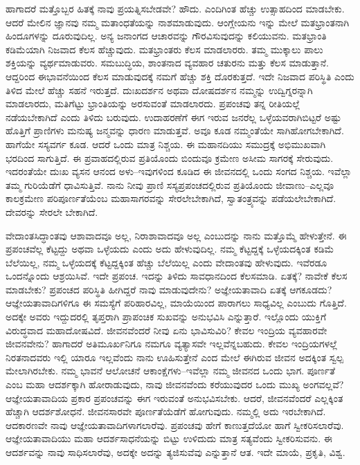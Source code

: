 ಹಾಗಾದರೆ ಮತ್ತೊಬ್ಬರ ಹಿತಕ್ಕೆ ನಾವು ಪ್ರಯತ್ನಿಸಬೇಡವೇ? ಹೌದು. ಎಂದಿಗಿಂತ ಹೆಚ್ಚು ಉತ್ಸಾಹದಿಂದ ಮಾಡಬೇಕು. ಆದರೆ ಮೇಲಿನ ಜ್ಞಾನವು ನಮ್ಮ ಮತಾಂಧತೆಯನ್ನು ನಾಶಮಾಡುವುದು. ಆಂಗ್ಲೇಯನು ಇನ್ನು ಮೇಲೆ ಮತಭ್ರಾಂತನಾಗಿ ಹಿಂದೂಗಳನ್ನು ದೂರುವುದಿಲ್ಲ. ಅನ್ಯ ಜನಾಂಗದ ಆಚಾರವನ್ನು ಗೌರವಿಸುವುದನ್ನು ಕಲಿಯುವನು. ಮತಭ್ರಾಂತಿ ಕಡಿಮೆಯಾಗಿ ನಿಜವಾದ ಕೆಲಸ ಹೆಚ್ಚುವುದು. ಮತಭ್ರಾಂತರು ಕೆಲಸ ಮಾಡಲಾರರು. ತಮ್ಮ ಮುಕ್ಕಾಲು ಪಾಲು ಶಕ್ತಿಯನ್ನು ವ್ಯರ್ಥಮಾಡುವರು. ಸಮಬುದ್ಧಿಯ, ಶಾಂತನಾದ ವ್ಯವಹಾರ ಚತುರನು ಮತ್ತು ಕೆಲಸ ಮಾಡುತ್ತಾನೆ. ಆದ್ದರಿಂದ ಈ\break ಭಾವನೆಯಿಂದ ಕೆಲಸ ಮಾಡುವುದಕ್ಕೆ ನಮಗೆ ಹೆಚ್ಚು ಶಕ್ತಿ ದೊರಕುತ್ತದೆ. ಇದೇ ನಿಜವಾದ ಪರಿಸ್ಥಿತಿ ಎಂದು ತಿಳಿದ ಮೇಲೆ ಹೆಚ್ಚು ಸಹನೆ ಇರುತ್ತದೆ. ದುಃಖದರ್ಶನ ಅಥವಾ ದೋಷದರ್ಶನ ನಮ್ಮನ್ನು ಉದ್ವಿಗ್ನರನ್ನಾಗಿ ಮಾಡಲಾರದು, ಮತಿಗೆಟ್ಟು ಭ್ರಾಂತಿಯನ್ನು ಅರಸುವಂತೆ ಮಾಡಲಾರದು. ಪ್ರಪಂಚವು ತನ್ನ ರೀತಿಯಲ್ಲೆ ನಡೆಯಬೇಕಾಗಿದೆ ಎಂದು ತಿಳಿದು ಬರುವುದು. ಉದಾಹರಣೆಗೆ ಈಗ ಇರುವ ಜನರೆಲ್ಲ ಒಳ್ಳೆಯವರಾಗಿಬಿಟ್ಟರೆ ಅಷ್ಟು ಹೊತ್ತಿಗೆ ಪ್ರಾಣಿಗಳು ಮನುಷ್ಯ ಜನ್ಮವನ್ನು ಧಾರಣ ಮಾಡುತ್ತವೆ. ಅವೂ ಕೂಡ ನಮ್ಮಂತೆಯೇ ಸಾಗಿಹೋಗಬೇಕಾಗಿದೆ. ಹಾಗೆಯೇ ಸಸ್ಯವರ್ಗ ಕೂಡ. ಆದರೆ ಒಂದು ಮಾತ್ರ ನಿಶ್ಚಯ. ಈ ಮಹಾನದಿಯು ಸಮುದ್ರಕ್ಕೆ ಅಭಿಮುಖವಾಗಿ ಭರದಿಂದ ಸಾಗುತ್ತಿದೆ. ಈ ಪ್ರವಾಹದಲ್ಲಿರುವ ಪ್ರತಿಯೊಂದು ಬಿಂದುವೂ ಕ್ರಮೇಣ ಅಸೀಮ ಸಾಗರಕ್ಕೆ ಸೇರುವುದು. ಇದರಂತೆಯೇ ದುಃಖ ವ್ಯಸನ ಆನಂದ ಅಳು–ಇವುಗಳಿಂದ ಕೂಡಿದ ಈ ಜೀವನದಲ್ಲಿ ಒಂದು ಸಂಗದ ನಿಶ್ಚಯ. ಇವೆಲ್ಲಾ ತಮ್ಮ ಗುರಿಯೆಡೆಗೆ ಧಾವಿಸುತ್ತಿವೆ. ನಾನು ನೀವು ಪ್ರಾಣಿ ಸಸ್ಯಪ್ರಪಂಚದಲ್ಲಿರುವ ಪ್ರತಿಯೊಂದು ಜೀವಾಣು–ಎಲ್ಲವೂ ಕಾಲಕ್ರಮೇಣ ಪರಿಪೂರ್ಣತೆಯೆಂಬ ಮಹಾಸಾಗರವನ್ನು ಸೇರಲೇಬೇಕಾಗಿದೆ, ಸ್ವಾತಂತ್ರ್ಯವನ್ನು ಪಡೆಯಲೇಬೇಕಾಗಿದೆ. ದೇವರನ್ನು ಸೇರಲೇ ಬೇಕಾಗಿದೆ.

\vskip 2pt

ವೇದಾಂತಸಿದ್ಧಾಂತವು ಆಶಾವಾದವೂ ಅಲ್ಲ, ನಿರಾಶಾವಾದವೂ ಅಲ್ಲ ಎಂಬುದನ್ನು ನಾನು ಮತ್ತೊಮ್ಮೆ ಹೇಳುತ್ತೇನೆ. ಈ ಪ್ರಪಂಚವೆಲ್ಲ ಕೆಟ್ಟದ್ದು ಅಥವಾ ಒಳ್ಳೆಯದು ಎಂದು ಅದು ಹೇಳುವುದಿಲ್ಲ. ನಮ್ಮ ಕೆಟ್ಟದ್ದಕ್ಕೆ ಒಳ್ಳೆಯದಕ್ಕಿಂತ ಕಡಿಮೆ ಬೆಲೆಯಿಲ್ಲ, ನಮ್ಮ ಒಳ್ಳೆಯದಕ್ಕೆ ಕೆಟ್ಟದ್ದಕ್ಕಿಂತ ಹೆಚ್ಚು ಬೆಲೆಯಿಲ್ಲ ಎಂದು ವೇದಾಂತವು ಹೇಳುವುದು. ಇವೆರಡೂ ಒಂದನ್ನೊಂದು ಆಶ್ರಯಿಸಿವೆ. ಇದೇ ಪ್ರಪಂಚ. ಇದನ್ನು ತಿಳಿದು ಸಾವಧಾನದಿಂದ ಕೆಲಸಮಾಡಿ. ಏತಕ್ಕೆ? ನಾವೇಕೆ ಕೆಲಸ ಮಾಡಬೇಕು? ಪ್ರಪಂಚದ ಪರಿಸ್ಥಿತಿ ಹೀಗಿದ್ದರೆ ನಾವು ಮಾಡುವುದೇನು? ಅಜ್ಞೇಯತಾವಾದಿ ಏತಕ್ಕೆ ಆಗಕೂಡದು? ಆಜ್ಞೇಯತಾವಾದಿಗಳಿಗೂ ಈ ಸಮಸ್ಯೆಗೆ ಪರಿಹಾರವಿಲ್ಲ, ಮಾಯೆಯಿಂದ ಪಾರಾಗಲು ಸಾಧ್ಯವಿಲ್ಲ ಎಂಬುದು ಗೊತ್ತಿದೆ. ಅದಕ್ಕೇ ಅವರು ಇದ್ದುದರಲ್ಲಿ ತೃಪ್ತರಾಗಿ ಪ್ರಾಪಂಚಿಕ ಸುಖವನ್ನು ಅನುಭವಿಸಿ ಎನ್ನುತ್ತಾರೆ. ಇಲ್ಲೊಂದು ಯುಕ್ತಿಗೆ ವಿರುದ್ಧವಾದ ಮಹಾದೋಷವಿದೆ. ಜೀವನವೆಂದರೆ ನೀವು ಏನು ಭಾವಿಸುವಿರಿ? ಕೇವಲ ಇಂದ್ರಿಯ ವ್ಯವಹಾರವೇ ಜೀವನವೇನು? ಹಾಗಾದರೆ ಅತಿಮೂರ್ಖನಿಗೂ ನಮಗೂ ವ್ಯತ್ಯಾಸವೇ ಇಲ್ಲವೆನ್ನಬಹುದು. ಕೇವಲ ಇಂದ್ರಿಯಗಳಲ್ಲೆ ನಿರತನಾದವರು ಇಲ್ಲಿ ಯಾರೂ ಇಲ್ಲವೆಂದು ನಾನು ಊಹಿಸುತ್ತೇನೆ ಎಂದ ಮೇಲೆ ಈಗಿರುವ ಜೀವನ ಅದಕ್ಕಿಂತ ಸ್ವಲ್ಪ ಮೇಲಾಗಿರಬೇಕು. ನಮ್ಮ ಭಾವನೆ ಆಲೋಚನೆ ಆಕಾಂಕ್ಷೆಗಳು–ಇವೆಲ್ಲಾ ನಮ್ಮ ಜೀವನದ ಒಂದು ಭಾಗ. ಪೂರ್ಣತೆ ಎಂಬ ಮಹಾ ಆದರ್ಶಕ್ಕಾಗಿ ಹೋರಾಡುವುದು, ನಾವು ಜೀವನವೆಂದು ಕರೆಯುವುದರ ಒಂದು ಮುಖ್ಯ ಅಂಗವಲ್ಲವೆ? ಆಜ್ಞೇಯತಾವಾದಿಯ ಪ್ರಕಾರ ಪ್ರಪಂಚವನ್ನು ಈಗ ಇರುವಂತೆ ಅನುಭವಿಸಬೇಕು. ಆದರೆ, ಜೀವನವೆಂದರೆ ಎಲ್ಲಕ್ಕಿಂತ ಹೆಚ್ಚಾಗಿ ಆದರ್ಶಶೋಧನೆ. ಜೀವನಸಾರವೇ ಪೂರ್ಣತೆಯೆಡೆಗೆ ಹೋಗುವುದು. ನಮ್ಮಲ್ಲಿ ಅದು ಇರಬೇಕಾಗಿದೆ. ಆದಕಾರಣವೇ ನಾವು ಆಜ್ಞೇಯತಾವಾದಿಗಳಾಗಲಾರೆವು. ಪ್ರಪಂಚವು ಹೇಗೆ ಕಾಣುತ್ತದೆಯೋ ಹಾಗೆ ಸ್ವೀಕರಿಸಲಾರೆವು. ಆಜ್ಞೇಯತಾವಾದಿಯು ಮಹಾ ಆದರ್ಶಸಾಧನೆಯನ್ನು ಬಿಟ್ಟು ಉಳಿದುದು ಮಾತ್ರ ಸತ್ಯವೆಂದು ಸ್ವೀಕರಿಸುವನು. ಈ ಆದರ್ಶವನ್ನು ನಾವು ಸಾಧಿಸಲಾರೆವು, ಅದಕ್ಕೇ ಅದನ್ನು ತ್ಯಜಿಸುವೆವು ಎನ್ನುತ್ತಾನೆ ಆತ. ಇದೇ ಮಾಯೆ, ಪ್ರಕೃತಿ, ವಿಶ್ವ.

